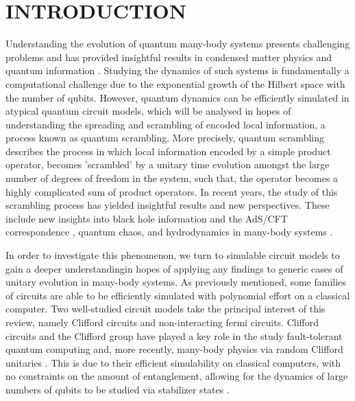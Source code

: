 \section{INTRODUCTION}
Understanding the evolution of quantum many-body systems presents challenging problems and has
provided insightful results in condensed matter physics and quantum information \cite{Polkovnikov_2011}.
Studying the dynamics of such systems is fundamentally
a computational challenge due to the exponential growth of the Hilbert space with the number of
qubits. However, quantum dynamics can be efficiently simulated in atypical quantum circuit models,
which will be analysed in hopes of understanding the spreading and scrambling of encoded local information,
a process known as quantum scrambling. More precisely, quantum scrambling describes the
process in which local information encoded by a simple product operator, becomes 'scrambled' by a
unitary time evolution amongst the large number of degrees of freedom in the system, such that, the
operator becomes a highly complicated sum of product operators. In recent years, the study of this scrambling process has yielded insightful
results and new perspectives. These include new insights into black hole information and the
AdS/CFT correspondence \cite{Calabrese_2009,Jerusalem,Jensen_2016,https://doi.org/10.48550/arxiv.1802.01198,Sekino_2008,ShenkerBlackHolesButterfly2014, Nozaki_2014, Calabrese_2005},
quantum chaos, \cite{Maldacena_2016, https://doi.org/10.48550/arxiv.1412.6087} and hydrodynamics in many-body systems \cite{Khemani_2018, PhysRevX.8.021013, PhysRevX.8.031058,Grozdanov_2018}.

In order to investigate this phenomenon, we turn to simulable circuit models  to gain a deeper understandingin hopes of applying any findings
to generic cases of unitary
evolution in many-body systems. As previously mentioned, some families of circuits are able to be efficiently
simulated with polynomial effort on a classical computer. Two well-studied circuit models take the principal interest of
this review, namely Clifford circuits and non-interacting fermi circuits. Clifford circuits and the Clifford
group have played a key role in the study fault-tolerant quantum computing and, more recently, many-body physics via
random Clifford unitaries \cite{PhysRevB.98.205136, https://doi.org/10.48550/arxiv.2110.02988}.
This is due to their efficient simulability on classical computers, with no constraints on the amount of entanglement,
allowing for the dynamics of large numbers of qubits to be studied via stabilizer states \cite{https://doi.org/10.48550/arxiv.2210.10129}.

